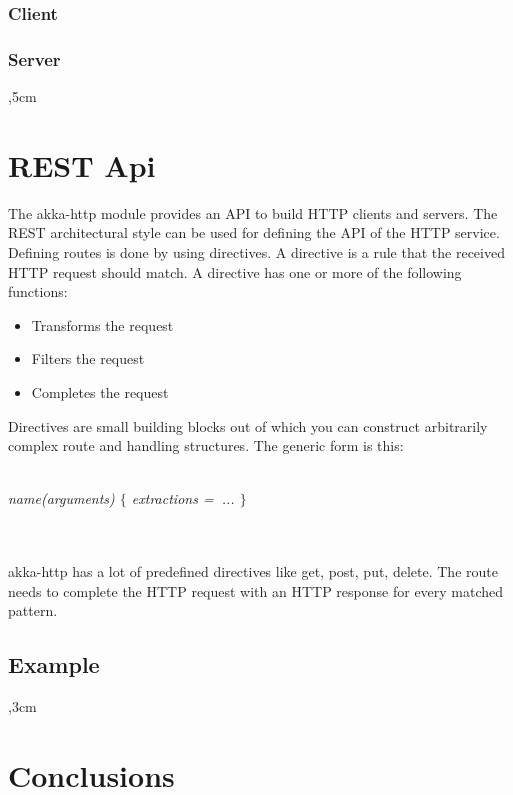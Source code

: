 \documentclass{article}
\begin{document}
\subsubsection{Client}

\vskip 0.3cm
\subsubsection{Server}


,5cm

\section{REST Api}
The akka-http module provides an API to build HTTP clients and servers. The REST architectural style can be used for defining the API of the HTTP service.
Defining routes is done by using directives. A directive is a rule that the received HTTP request should match. A directive has one or more of the following functions:
\begin{itemize}
\item Transforms the request
\item Filters the request
\item Completes the request
\end{itemize}
Directives are small building blocks out of which you can construct arbitrarily complex route and handling structures. The generic form is this: \\ \\
\centerline{\textit{name(arguments) $\{$ extractions =$\>$ ... $\}$}}
\\ \\
akka-http has a lot of predefined directives like get, post, put, delete. The route needs to complete the HTTP request with an HTTP response for every matched pattern.

\subsection{Example}

,3cm

\section{Conclusions}
\end{document}

